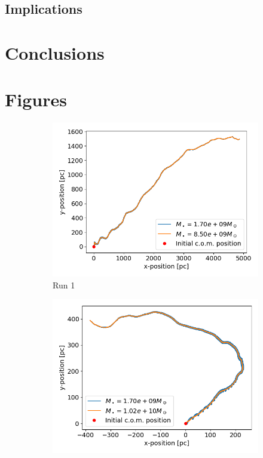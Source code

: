 \documentclass[english, oneside]{HYgradu}
\begin{document}
\section{Implications}


\chapter{Conclusions}

\appendix

\chapter{Figures}

\begin{figure}
	\centering
	\begin{subfigure}[b]{0.49\textwidth}
		\includegraphics[width=\textwidth]{Run1_Trajectory_small.png}
		\caption{Run 1}
	\end{subfigure}
	\begin{subfigure}[b]{0.49\textwidth}
		\includegraphics[width=\textwidth]{Run2_Trajectory_small.png}

\end{subfigure}
\end{figure}
\end{document}
